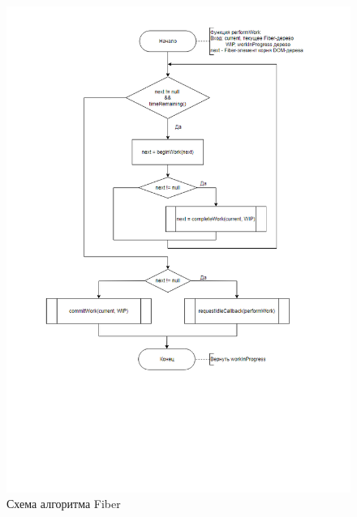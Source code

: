 \begin{figure}[h]
	\centering
	\includegraphics[width=170mm]{img/fiber-main.png}
	\caption{Схема алгоритма Fiber}
	\label{fig:fiber-main}
\end{figure}

